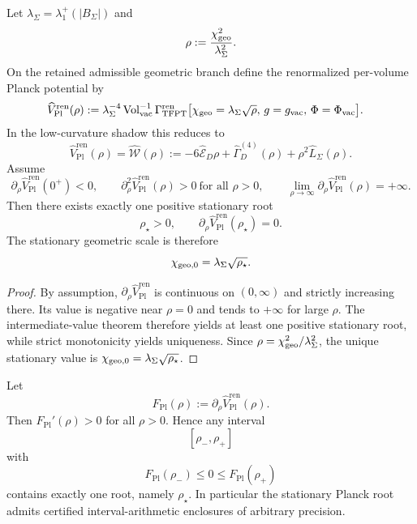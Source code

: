 \begin{theorem}
\label{thm:absolute-spectral-planck-closure}
\label{thm:stationary_geometric_scale_equation}
Let $\lambda_\Sigma=\lambda_1^+(|B_\Sigma|)$ and
\[
\rho:=\frac{\chi_{\mathrm{geo}}^2}{\lambda_\Sigma^2}.
\]
On the retained admissible geometric branch define the renormalized per-volume Planck potential by
\[
\begin{aligned}
\widehat V_{\mathrm{Pl}}^{\mathrm{ren}}(\rho)
&:=
\lambda_\Sigma^{-4}\operatorname{Vol}_{\mathrm{vac}}^{-1}
\Gamma_{\mathrm{TFPT}}^{\mathrm{ren}}
\bigl[\chi_{\mathrm{geo}}=\lambda_\Sigma\sqrt{\rho},\,g=g_{\mathrm{vac}},\,\Phi=\Phi_{\mathrm{vac}}\bigr].
\end{aligned}
\]
In the low-curvature shadow this reduces to
\[
\widehat V_{\mathrm{Pl}}^{\mathrm{ren}}(\rho)=\widehat{\mathcal W}(\rho)
:=
-6\widehat{\mathcal E}_D\rho
+
\widehat\Gamma_D^{(4)}(\rho)
+
\rho^2\widehat L_\Sigma(\rho).
\]
Assume
\[
\partial_\rho\widehat V_{\mathrm{Pl}}^{\mathrm{ren}}(0^+)<0,
\qquad
\partial_\rho^2\widehat V_{\mathrm{Pl}}^{\mathrm{ren}}(\rho)>0\ \text{for all }\rho>0,
\qquad
\lim_{\rho\to\infty}\partial_\rho\widehat V_{\mathrm{Pl}}^{\mathrm{ren}}(\rho)=+\infty.
\]
Then there exists exactly one positive stationary root
\[
\rho_\star>0,
\qquad
\partial_\rho\widehat V_{\mathrm{Pl}}^{\mathrm{ren}}(\rho_\star)=0.
\]
The stationary geometric scale is therefore
\[
\chi_{\mathrm{geo},0}=\lambda_\Sigma\sqrt{\rho_\star}.
\]
\end{theorem}

\begin{proof}
By assumption, $\partial_\rho\widehat V_{\mathrm{Pl}}^{\mathrm{ren}}$ is continuous on $(0,\infty)$
and strictly increasing there. Its value is negative near $\rho=0$ and tends to $+\infty$ for
large $\rho$. The intermediate-value theorem therefore yields at least one positive stationary root,
while strict monotonicity yields uniqueness. Since $\rho=\chi_{\mathrm{geo}}^2/\lambda_\Sigma^2$, the unique
stationary value is
$\chi_{\mathrm{geo},0}=\lambda_\Sigma\sqrt{\rho_\star}$.
\end{proof}

\begin{corollary}
\label{cor:computable-spectral-planck-root}
Let
\[
F_{\mathrm{Pl}}(\rho):=\partial_\rho\widehat V_{\mathrm{Pl}}^{\mathrm{ren}}(\rho).
\]
Then $F_{\mathrm{Pl}}'(\rho)>0$ for all $\rho>0$. Hence any interval
\[
[\rho_-,\rho_+]
\]
with
\[
F_{\mathrm{Pl}}(\rho_-)\le 0\le F_{\mathrm{Pl}}(\rho_+)
\]
contains exactly one root, namely $\rho_\star$. In particular the stationary Planck root admits
certified interval-arithmetic enclosures of arbitrary precision.
\end{corollary}


